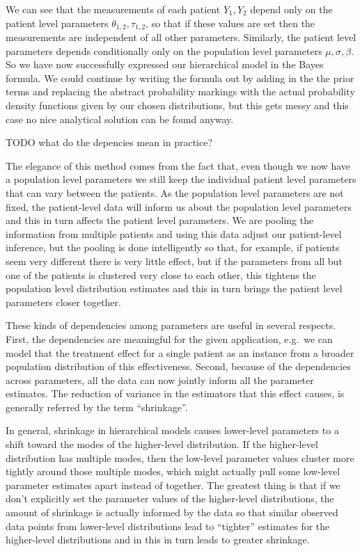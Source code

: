 \documentclass[12pt,a4paper,leqno]{report}
\theoremstyle{plain}
\theoremstyle{definition}
\theoremstyle{remark}
\begin{document}
We can see that the measurements of each patient \(Y_1, Y_2\) depend only on the patient
level parameters \(\theta_{1,2}, \tau_{1,2}\), so that if these values are set then the
measurements are independent of all other parameters. Similarly, the patient level parameters depends conditionally only
on the population level parameters \(\mu, \sigma, \beta\). So we have now successfully
expressed our hierarchical model in the Bayes formula. We could continue by writing the
formula out by adding in the the prior terms and replacing the abstract probability
markings with the actual probability density functions given by our chosen
distributions, but this gets messy and this case no nice analytical solution can be
found anyway.

TODO what do the depencies mean in practice?

The elegance of this method comes from the fact that, even though we now have a population
level parameters we still keep the individual patient level parameters that can vary
between the patients. As the population level parameters are not fixed, the patient-level data will inform us about the population
level parameters and this in turn affects the patient level parameters. We
are pooling the information from multiple patients and using this data adjust our
patient-level inference, but the pooling is done intelligently so that, for example, if
patients seem very different there is very little effect, but if the parameters from all
but one of the patients is clustered very close to each other, this tightens the
population level distribution estimates and this in turn brings the patient level
parameters closer together.

These kinds of dependencies among parameters are useful in several respects.
First, the dependencies are meaningful for the given application, e.g.\ we can
model that the treatment effect for a single patient as an instance from a
broader population distribution of this effectiveness. Second, because of the
dependencies across parameters, all the data can now jointly inform all the
parameter estimates. The reduction of variance in the estimators that this
effect causes, is generally referred by the term ``shrinkage''.

In general, shrinkage in hierarchical models causes lower-level parameters to
a shift toward the modes of the higher-level distribution. If the higher-level
distribution has multiple modes, then the low-level parameter values cluster
more tightly around those multiple modes, which might actually pull some
low-level parameter estimates apart instead of together. The greatest thing
is that if we don't explicitly set the parameter values of the higher-level
distributions, the amount of shrinkage is actually informed by the data so that
similar observed data points from lower-level distributions lead to ``tighter''
estimates for the higher-level distributions and in this in turn leads to
greater shrinkage.
\end{document}

